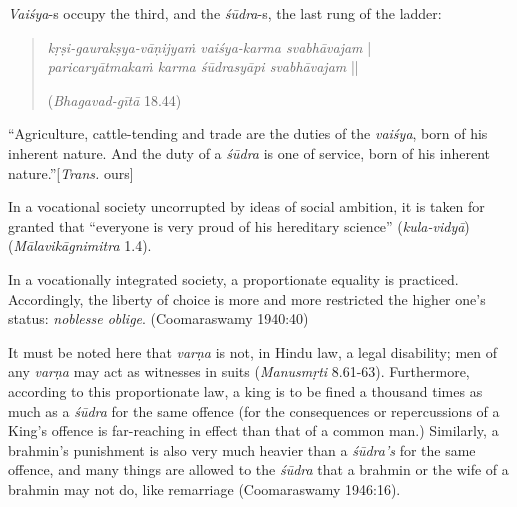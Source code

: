{\sl Vaiśya}-s occupy the third, and the {\sl śūdra}-s, the last rung of the ladder: 

\begin{quote}
{{\sl kṛṣi-gaurakṣya-vāṇijyaṁ vaiśya-karma svabhāvajam}} |\\
{\sl paricaryātmakaṁ karma śūdrasyāpi svabhāvajam} || 

\hfill ({\sl Bhagavad-gītā} 18.44)
\end{quote}

\begin{myquote}
“Agriculture, cattle-tending and trade are the duties of the {\sl vaiśya}, born of his inherent nature. And the duty of a {\sl śūdra} is one of service, born of his inherent nature.”\hfill [{\sl Trans.} ours]
\end{myquote}

In a vocational society uncorrupted by ideas of social ambition, it is taken for granted that “everyone is very proud of his hereditary science” ({\sl kula-vidyā}) ({\sl Mālavikāgnimitra} 1.4).

In a vocationally integrated society, a proportionate equality is practiced. Accordingly, the liberty of choice is more and more restricted the higher one’s status: {\sl noblesse oblige}. (Coomaraswamy 1940:40)

It must be noted here that {\sl varṇa} is not, in Hindu law, a legal disability; men of any {\sl varṇa} may act as witnesses in suits ({\sl Manusmṛti} 8.61-63). Furthermore, according to this proportionate law, a king is to be fined a thousand times as much as a {\sl śūdra} for the same offence (for the consequences or repercussions of a King’s offence is far-reaching in effect than that of a common man.) Similarly, a brahmin’s punishment is also very much heavier than a {\sl śūdra’s} for the same offence, and many things are allowed to the {\sl śūdra} that a brahmin or the wife of a brahmin may not do, like remarriage (Coomaraswamy 1946:16). 

